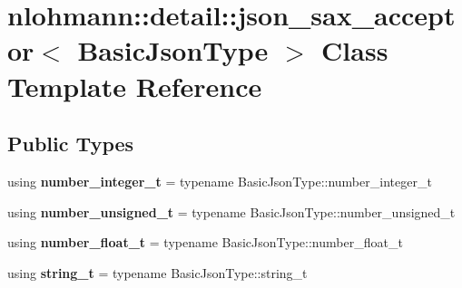 \hypertarget{classnlohmann_1_1detail_1_1json__sax__acceptor}{}\section{nlohmann\+:\+:detail\+:\+:json\+\_\+sax\+\_\+acceptor$<$ Basic\+Json\+Type $>$ Class Template Reference}
\label{classnlohmann_1_1detail_1_1json__sax__acceptor}
\subsection*{Public Types}
\begin{DoxyCompactItemize}
\item 
\mbox{\label{classnlohmann_1_1detail_1_1json__sax__acceptor_a41876b17c0e8bdb55580eaf5e4e2ded8}} 
using {\bfseries number\+\_\+integer\+\_\+t} = typename Basic\+Json\+Type\+::number\+\_\+integer\+\_\+t
\item 
\mbox{\label{classnlohmann_1_1detail_1_1json__sax__acceptor_ae07454608ea6f3cfb765f95e3c850043}} 
using {\bfseries number\+\_\+unsigned\+\_\+t} = typename Basic\+Json\+Type\+::number\+\_\+unsigned\+\_\+t
\item 
\mbox{\label{classnlohmann_1_1detail_1_1json__sax__acceptor_a5502f483fc60a1bcd73e0e46b6ab36e4}} 
using {\bfseries number\+\_\+float\+\_\+t} = typename Basic\+Json\+Type\+::number\+\_\+float\+\_\+t
\item 
\mbox{\label{classnlohmann_1_1detail_1_1json__sax__acceptor_a3a8078bbf865ec355106f6048241609a}} 
using {\bfseries string\+\_\+t} = typename Basic\+Json\+Type\+::string\+\_\+t
\end{DoxyCompactItemize}
